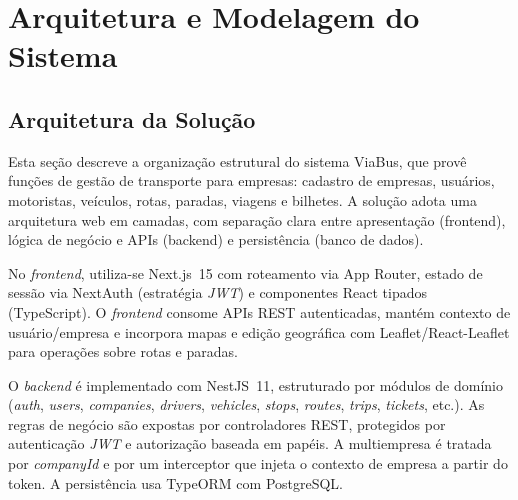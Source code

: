 \chapter{Arquitetura e Modelagem do Sistema} \label{cha:arquitetura}

\section{Arquitetura da Solução}
Esta seção descreve a organização estrutural do sistema ViaBus, que provê funções de gestão de transporte para empresas: cadastro de empresas, usuários, motoristas, veículos, rotas, paradas, viagens e bilhetes. A solução adota uma arquitetura web em camadas, com separação clara entre apresentação (frontend), lógica de negócio e APIs (backend) e persistência (banco de dados).

No \textit{frontend}, utiliza-se Next.js~15 com roteamento via App Router, estado de sessão via NextAuth (estratégia \textit{JWT}) e componentes React tipados (TypeScript). O \textit{frontend} consome APIs REST autenticadas, mantém contexto de usuário/empresa e incorpora mapas e edição geográfica com Leaflet/React-Leaflet para operações sobre rotas e paradas.

O \textit{backend} é implementado com NestJS~11, estruturado por módulos de domínio (\textit{auth}, \textit{users}, \textit{companies}, \textit{drivers}, \textit{vehicles}, \textit{stops}, \textit{routes}, \textit{trips}, \textit{tickets}, etc.). As regras de negócio são expostas por controladores REST, protegidos por autenticação \textit{JWT} e autorização baseada em papéis. A multiempresa é tratada por \textit{companyId} e por um interceptor que injeta o contexto de empresa a partir do token. A persistência usa TypeORM com PostgreSQL.

